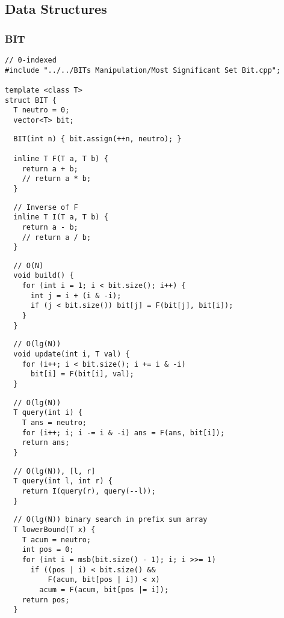 \documentclass[twoside]{article}
\begin{document}
\begin{multicols*}{2}
\subsection*{Data Structures}
\vspace{2em}
\subsubsectionfont{\large\bfseries\sffamily\underline}
\subsubsection*{BIT}
\begin{verbatim}
// 0-indexed
#include "../../BITs Manipulation/Most Significant Set Bit.cpp";

template <class T>
struct BIT {
  T neutro = 0;
  vector<T> bit;
\end{verbatim}
\vspace{-12pt}
\begin{verbatim}
  BIT(int n) { bit.assign(++n, neutro); }

  inline T F(T a, T b) {
    return a + b;
    // return a * b;
  }
\end{verbatim}
\vspace{-12pt}
\begin{verbatim}
  // Inverse of F
  inline T I(T a, T b) {
    return a - b;
    // return a / b;
  }
\end{verbatim}
\vspace{-12pt}
\begin{verbatim}
  // O(N)
  void build() {
    for (int i = 1; i < bit.size(); i++) {
      int j = i + (i & -i);
      if (j < bit.size()) bit[j] = F(bit[j], bit[i]);
    }
  }
\end{verbatim}
\vspace{-12pt}
\begin{verbatim}
  // O(lg(N))
  void update(int i, T val) {
    for (i++; i < bit.size(); i += i & -i)
      bit[i] = F(bit[i], val);
  }
\end{verbatim}
\vspace{-12pt}
\begin{verbatim}
  // O(lg(N))
  T query(int i) {
    T ans = neutro;
    for (i++; i; i -= i & -i) ans = F(ans, bit[i]);
    return ans;
  }
\end{verbatim}
\vspace{-12pt}
\begin{verbatim}
  // O(lg(N)), [l, r]
  T query(int l, int r) {
    return I(query(r), query(--l));
  }
\end{verbatim}
\vspace{-12pt}
\begin{verbatim}
  // O(lg(N)) binary search in prefix sum array
  T lowerBound(T x) {
    T acum = neutro;
    int pos = 0;
    for (int i = msb(bit.size() - 1); i; i >>= 1)
      if ((pos | i) < bit.size() &&
          F(acum, bit[pos | i]) < x)
        acum = F(acum, bit[pos |= i]);
    return pos;
  }


\end{verbatim}
\end{multicols*}
\end{document}

